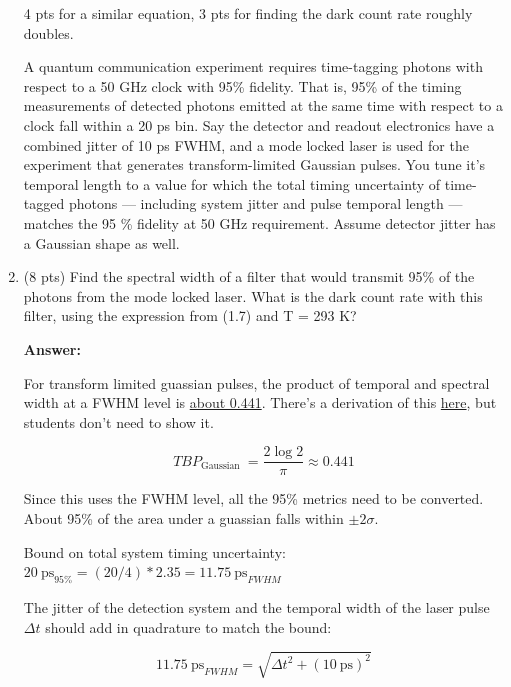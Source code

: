 \documentclass[12pt]{caltech_thesis}
\begin{document}
\begin{enumerate}
  {\color{darkred} 4 pts for a similar equation, 3 pts for finding the
  dark count rate roughly doubles. }

  A quantum communication experiment requires time-tagging photons with
  respect to a 50 GHz clock with 95\% fidelity. That is, 95\% of the
  timing measurements of detected photons emitted at the same time with
  respect to a clock fall within a 20 ps bin. Say the detector and
  readout electronics have a combined jitter of 10 ps FWHM, and a mode
  locked laser is used for the experiment that generates
  transform-limited Gaussian pulses. You tune it's temporal length to a
  value for which the total timing uncertainty of time-tagged photons
  --- including system jitter and pulse temporal length --- matches the
  95 \% fidelity at 50 GHz requirement. Assume detector jitter has a
  Gaussian shape as well.
\item
  (8 pts) Find the spectral width of a filter that would transmit 95\%
  of the photons from the mode locked laser. What is the dark count rate
  with this filter, using the expression from (1.7) and T = 293 K?

  {\color{midnightblue}  \textbf{Answer:} }

  {\color{midnightblue} For transform limited guassian pulses, the
  product of temporal and spectral width at a FWHM level is
  \href{https://www.lasercalculator.com/transform-limited-pulse-calculator/}{about
  0.441}. There's a derivation of this
  \href{https://www.physicsforums.com/threads/time-bandwidth-product-ideal-mode-locking.171404/post-1339948}{here},
  but students don't need to show it. }

  {\color{midnightblue} 

  \[T B P_{\text {Gaussian }}=\frac{2 \log 2}{\pi} \approx 0.441\]

  }

  {\color{midnightblue}  Since this uses the FWHM level, all the 95\%
  metrics need to be converted. About 95\% of the area under a guassian
  falls within \(\pm 2 \sigma\). }

  {\color{midnightblue}  Bound on total system timing uncertainty:
  \(20~\text{ps}_{95\%} = (20/4)*2.35 = 11.75~\text{ps}_{FWHM}\) }

  {\color{midnightblue}  The jitter of the detection system and the
  temporal width of the laser pulse \(\Delta t\) should add in
  quadrature to match the bound: }

  {\color{midnightblue} 

  \[ 11.75~\text{ps}_{FWHM} = \sqrt{ \Delta t^2 + (10~\text{ps})^2}\]

}
\end{enumerate}
\end{document}
